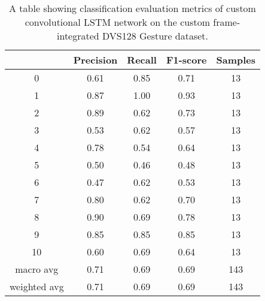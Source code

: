 \begin{table}[htb]
    \centering
    \begin{tabular}{|| c | c | c | c | c ||}
        \hline
             & Precision & Recall & F1-score & Samples \\
        \hline \hline
        0            & 0.61 & 0.85 & 0.71 & 13  \\
        \hline
        1            & 0.87 & 1.00 & 0.93 & 13  \\
        \hline
        2            & 0.89 & 0.62 & 0.73 & 13  \\
        \hline
        3            & 0.53 & 0.62 & 0.57 & 13  \\
        \hline
        4            & 0.78 & 0.54 & 0.64 & 13  \\
        \hline
        5            & 0.50 & 0.46 & 0.48 & 13  \\
        \hline
        6            & 0.47 & 0.62 & 0.53 & 13  \\
        \hline
        7            & 0.80 & 0.62 & 0.70 & 13  \\
        \hline
        8            & 0.90 & 0.69 & 0.78 & 13  \\
        \hline
        9            & 0.85 & 0.85 & 0.85 & 13  \\
        \hline
        10           & 0.60 & 0.69 & 0.64 & 13  \\
        \hline
        macro avg    & 0.71 & 0.69 & 0.69 & 143 \\
        \hline
        weighted avg & 0.71 & 0.69 & 0.69 & 143 \\
        \hline
    \end{tabular}
    \caption{A table showing classification evaluation metrics of custom convolutional LSTM network on the custom frame-integrated DVS128 Gesture dataset.}
    \label{tab:custom_conv_lstm_dvs128_custom_frame_evaluation_metrics}
\end{table}


